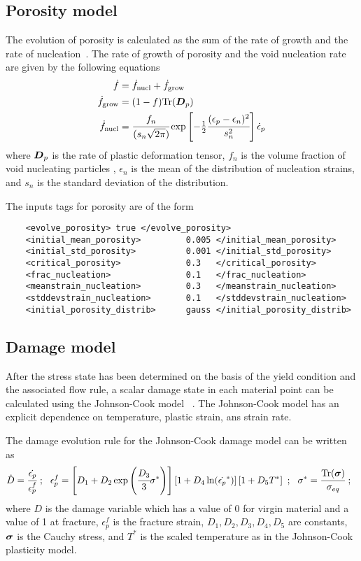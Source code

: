   \subsection{Porosity model}
  The evolution of porosity is calculated as the sum of the rate of growth 
  and the rate of nucleation~\cite{Ramaswamy1998a}.  The rate of growth of
  porosity and the void nucleation rate are given by the following equations
  ~\cite{Chu1980}
  \begin{align}
    \dot{f} &= \dot{f}_{\text{nucl}} + \dot{f}_{\text{grow}} \\
    \dot{f}_{\text{grow}} & = (1-f) \text{Tr}(\boldsymbol{D}_p) \\
    \dot{f}_{\text{nucl}} & = \cfrac{f_n}{(s_n \sqrt{2\pi})}
            \exp\left[-\tfrac{1}{2} \cfrac{(\epsilon_p - \epsilon_n)^2}{s_n^2}\right]
            \dot{\epsilon}_p
  \end{align}
  where $\boldsymbol{D}_p$ is the rate of plastic deformation tensor, $f_n$ is the volume 
  fraction of void nucleating particles , $\epsilon_n$ is the mean of the 
  distribution of nucleation strains, and $s_n$ is the standard 
  deviation of the distribution.

  The inputs tags for porosity are of the form
  \lstset{language=XML}
  \begin{lstlisting}
    <evolve_porosity> true </evolve_porosity>
    <initial_mean_porosity>         0.005 </initial_mean_porosity>
    <initial_std_porosity>          0.001 </initial_std_porosity>
    <critical_porosity>             0.3   </critical_porosity>
    <frac_nucleation>               0.1   </frac_nucleation>
    <meanstrain_nucleation>         0.3   </meanstrain_nucleation>
    <stddevstrain_nucleation>       0.1   </stddevstrain_nucleation>
    <initial_porosity_distrib>      gauss </initial_porosity_distrib>
  \end{lstlisting}

  \subsection{Damage model}
  After the stress state has been determined on the basis of the yield condition
  and the associated flow rule, a scalar damage state in each material point can
  be calculated using the Johnson-Cook model ~\cite{Johnson1985}.  
  The Johnson-Cook model has an explicit dependence on temperature, plastic
  strain, ans strain rate.

  The damage evolution rule for the Johnson-Cook damage model can be written as
  \begin{equation}
    \dot{D} = \cfrac{\dot{\epsilon_p}}{\epsilon_p^f} ~;~~
    \epsilon_p^f = 
      \left[D_1 + D_2 \exp \left(\cfrac{D_3}{3} \sigma^*\right)\right]
      \left[1+ D_4 \ln(\dot{\epsilon_p}^*)\right]
      \left[1+D_5 T^*\right]~;~~
    \sigma^*= \cfrac{\text{Tr}(\boldsymbol{\sigma})}{\sigma_{eq}}~;~~
  \end{equation}
  where $D$ is the damage variable which has a value of 0 for virgin material
  and a value of 1 at fracture, $\epsilon_p^f$ is the fracture strain, 
  $D_1, D_2, D_3, D_4, D_5$ are constants, $\boldsymbol{\sigma}$ is the Cauchy stress, and
  $T^*$ is the scaled temperature as in the Johnson-Cook plasticity model.

